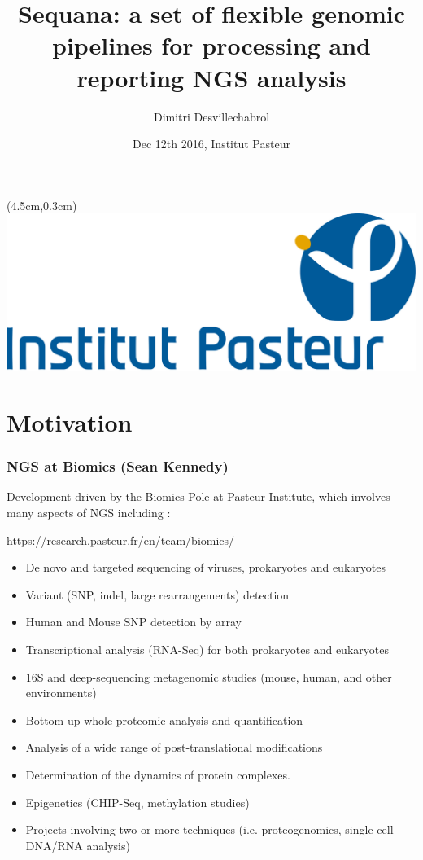 \documentclass{beamer}
\title[Sequana]{Sequana: a set of flexible genomic pipelines for processing and reporting NGS analysis}
\author[D.Desvillechabrol]{Dimitri Desvillechabrol}
\institute{Institut Pasteur}
\date{Dec 12th 2016, Institut Pasteur}
\begin{document}

\begin{frame}[plain]
    \titlepage
    \begin{textblock*}{5cm}(4.5cm,0.3cm)
        \includegraphics[scale=0.09]{images/Institut_Pasteur.png}
    \end{textblock*}
\end{frame}


\section{Motivation}

\begin{frame}
    \frametitle{NGS at Biomics (Sean Kennedy)}
 
 Development driven by the Biomics Pole at Pasteur Institute, which involves
 many aspects of NGS including :
 
 \tiny
 \begin{block}{https://research.pasteur.fr/en/team/biomics/}
  \begin{itemize}
  \item De novo and targeted sequencing of viruses, prokaryotes and eukaryotes
  \item Variant (SNP, indel, large rearrangements) detection
  \item Human and Mouse SNP detection by array
  \item Transcriptional analysis (RNA-Seq) for both prokaryotes and eukaryotes
  \item 16S and deep-sequencing metagenomic studies (mouse, human, and other environments)
  \item Bottom-up whole proteomic analysis and quantification
  \item Analysis of a wide range of post-translational modifications
  \item Determination of the dynamics of protein complexes.
  \item Epigenetics (CHIP-Seq, methylation studies)
  \item Projects involving two or more techniques (i.e. proteogenomics, single-cell DNA/RNA analysis)
  \end{itemize}
 \end{block}
 \small 
\end{frame}
\end{document}
